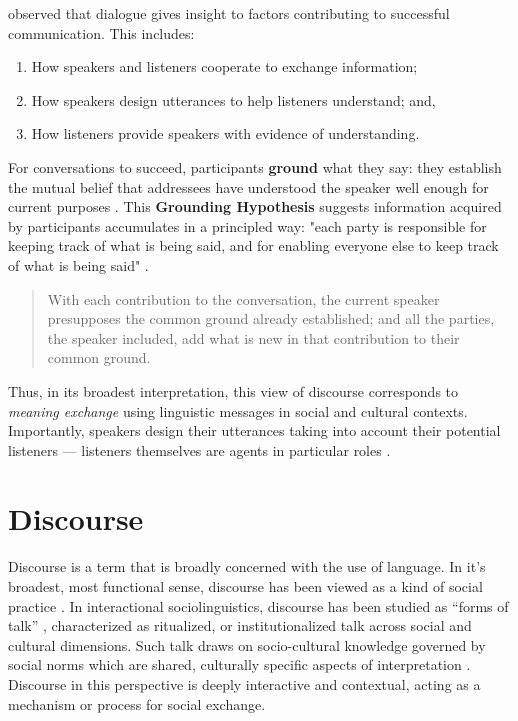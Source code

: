 \cite{Clark:1996tm} observed that dialogue gives insight to factors contributing to successful communication.  This includes:
\begin{enumerate}
\item How speakers and listeners cooperate to exchange information;
\item How speakers design utterances to help listeners understand; and,
\item How listeners provide speakers with evidence of understanding.
\end{enumerate}
For conversations to succeed, participants \textbf{ground} what they say: they establish the mutual belief that addressees have understood the speaker well enough for current purposes \citep{Clark:1989ur}. This \textbf{Grounding Hypothesis} suggests information acquired by participants accumulates in a principled way: "each party is responsible for keeping track of what is being said, and for enabling everyone else to keep track of what is being said" \citep{Clark:2001uu}. 
\begin{quote}
With each contribution to the conversation, the current speaker presupposes the common ground already established; and all the parties, the speaker included, add what is new in that contribution to their common ground. \citep[208]{Clark:1992ty}
\end{quote}
Thus, in its broadest interpretation, this view of discourse corresponds to \textit{meaning exchange} using linguistic messages in social and cultural contexts. Importantly, speakers design their utterances taking into account their potential listeners --- listeners themselves are agents in particular roles \citep{Clark:1992ty}.


\section{Discourse}
\label{discourse}

Discourse is a term that is broadly concerned with the use of language. In it's broadest, most functional sense, discourse has been viewed as a kind of social practice  \citep{Goffman:1981tm,Hymes:1974wr,Leech:1983vf,gumperz:1972tf,Brown:1983wy}.  In interactional sociolinguistics, discourse has been studied as ``forms of talk''  \citep{Goffman:1981tm},  characterized as ritualized, or institutionalized talk across social and cultural dimensions. Such talk draws on socio-cultural knowledge governed by social norms which are shared, culturally specific aspects of interpretation  \citep{Gumperz:1982tc,Hymes:1974wr,Gumperz:1964ug}.  Discourse in this perspective is deeply interactive and contextual, acting as a mechanism or process for social exchange.


